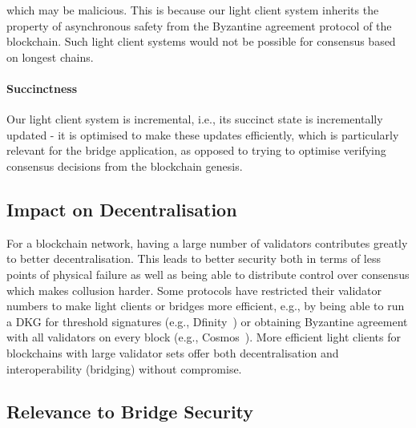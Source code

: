which may be malicious. This is because our light client system inherits the property of asynchronous safety from the Byzantine agreement
protocol of the blockchain. Such light client systems would not be possible for consensus based on longest chains.
\vspace{-0.2cm}
\noindent\paragraph{Succinctness}Our light client system is incremental, i.e., its succinct state is incrementally updated - it is optimised to make these updates efficiently, which is particularly relevant for the bridge application, as opposed to trying to optimise verifying consensus decisions from the blockchain genesis.
\vspace{-0.2cm}
\subsection{Impact on Decentralisation}For a blockchain network, having a large number of validators contributes greatly to better decentralisation. This leads to better security both in terms of less points of physical failure as well as being able to distribute control over consensus which makes collusion harder. Some protocols have restricted their validator numbers to make light clients or bridges more efficient, e.g., by being able to run a DKG for threshold signatures (e.g., Dfinity~\cite{dfinity}) or obtaining Byzantine agreement with all validators on every block (e.g., Cosmos~\cite{tendermint_paper}). More efficient light clients for blockchains with large validator sets offer both decentralisation and interoperability (bridging) without compromise.

\vspace{-0.25cm}
\subsection{Relevance to Bridge Security}

